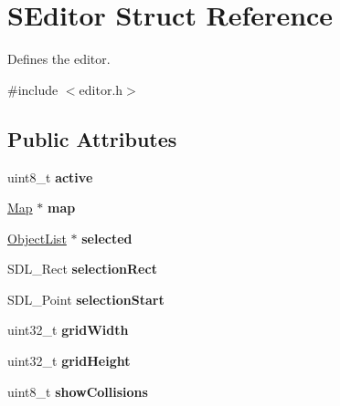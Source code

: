 \hypertarget{structSEditor}{\section{S\-Editor Struct Reference}
\label{structSEditor}
}


Defines the editor.  




{\ttfamily \#include $<$editor.\-h$>$}

\subsection*{Public Attributes}
\begin{DoxyCompactItemize}
\item 
\hypertarget{structSEditor_a78c093c537b4b5bcd6f21caa0550f264}{uint8\-\_\-t {\bfseries active}}\label{structSEditor_a78c093c537b4b5bcd6f21caa0550f264}

\item 
\hypertarget{structSEditor_aa96d46d208c5ebe5a66c8e9a60fc3f1d}{\hyperlink{structSMap}{Map} $\ast$ {\bfseries map}}\label{structSEditor_aa96d46d208c5ebe5a66c8e9a60fc3f1d}

\item 
\hypertarget{structSEditor_a11d2c8f663d92b2dbec8572ed2c04a72}{\hyperlink{structSObjectList}{Object\-List} $\ast$ {\bfseries selected}}\label{structSEditor_a11d2c8f663d92b2dbec8572ed2c04a72}

\item 
\hypertarget{structSEditor_abe1ede0aeb43d5e5fb41a7e73f227803}{S\-D\-L\-\_\-\-Rect {\bfseries selection\-Rect}}\label{structSEditor_abe1ede0aeb43d5e5fb41a7e73f227803}

\item 
\hypertarget{structSEditor_ae5061ec189cc566ddbe5a1921bcdd42e}{S\-D\-L\-\_\-\-Point {\bfseries selection\-Start}}\label{structSEditor_ae5061ec189cc566ddbe5a1921bcdd42e}

\item 
\hypertarget{structSEditor_ad23b284b1514bc642932fdfac33dd7d7}{uint32\-\_\-t {\bfseries grid\-Width}}\label{structSEditor_ad23b284b1514bc642932fdfac33dd7d7}

\item 
\hypertarget{structSEditor_a13f835c0325b60a9696a474f0a1065c6}{uint32\-\_\-t {\bfseries grid\-Height}}\label{structSEditor_a13f835c0325b60a9696a474f0a1065c6}

\item 
\hypertarget{structSEditor_a41040bda92c9ed6ac07a750c2ee4964c}{uint8\-\_\-t {\bfseries show\-Collisions}}\label{structSEditor_a41040bda92c9ed6ac07a750c2ee4964c}


\end{DoxyCompactItemize}
